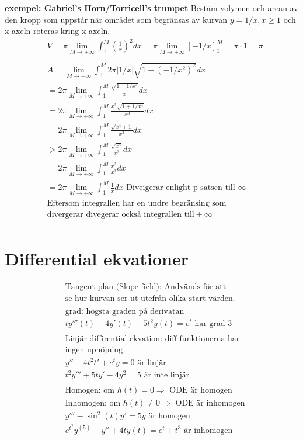 \begin{multicols}{2}
\textbf{exempel: Gabriel's Horn/Torricell's trumpet }
Bestäm volymen och arean av den kropp som uppstår när området som begränsas av kurvan
$y = 1/x, x\geq1$ och x-axeln roteras kring x-axeln.
\begin{align*}
  &V=\pi \lim_{M\to+\infty} \int_1^M {(\frac{1}{x})}^2 dx = \pi \lim_{M\to+\infty}{[-1/x]}_1^M
  = \pi\cdot1 = \pi \\
  &\\
  &A = \lim_{M\to+\infty}\int_1^M 2\pi|1/x|\sqrt{1+{(-1/x^2)}^2} dx \\
  &= 2\pi \lim_{M\to+\infty}\int_1^M \frac{\sqrt{1+1/x^4}}{x} dx \\
  &= 2\pi \lim_{M\to+\infty}\int_1^M \frac{x^2\sqrt{1+1/x^4}}{x^3} dx \\
  &= 2\pi \lim_{M\to+\infty}\int_1^M \frac{\sqrt{x^4+1}}{x^3} dx \\
  &> 2\pi \lim_{M\to+\infty}\int_1^M \frac{\sqrt{x^4}}{x^3} dx \\
  &= 2\pi \lim_{M\to+\infty}\int_1^M \frac{x^2}{x^3} dx \\
  &= 2\pi \lim_{M\to+\infty}\int_1^M \frac{1}{x} dx  \text{ Diveigerar enlight p-satsen till } \infty \\
  &\text{Eftersom integrallen har en undre begränsing som} \\
  &\text{divergerar divegerar också integrallen till} +\infty \\
\end{align*}



\section{Differential ekvationer}
 
\begin{align*}
  &\text{Tangent plan (Slope field): Andvänds för att} \\
  &\text{se hur kurvan ser ut utefrån olika start värden.} \\
  &\\
  &\text{grad: högsta graden på derivatan } \\
  &t y'''(t) - 4y'(t) + 5t^2y(t) = e^t \text{ har grad 3} \\
  &\\
  &\text{Linjär diffirential ekvation: diff funktionerna har} \\
  &\text{ingen uphöjning } \\
  &y'' - 4t^2t' + e^t y = 0 \text{ är linjär} \\
  &t^2 y''' + 5ty' - 4y^2 = 5 \text{ är inte linjär} \\
  &\\
  &\text{Homogen: om } h(t)=0 \Rightarrow \text{ ODE är homogen} \\
  &\text{Inhomogen: om } h(t)\neq0 \Rightarrow \text{ ODE är inhomogen} \\
  &y''' - \sin^2(t)y' = 5y \text{ är homogen} \\
  &e^{t^2} y^{(5)} - y'' + 4ty(t) = e^t + t^3 \text{ är inhomogen} \\
\end{align*}


\end{multicols}
